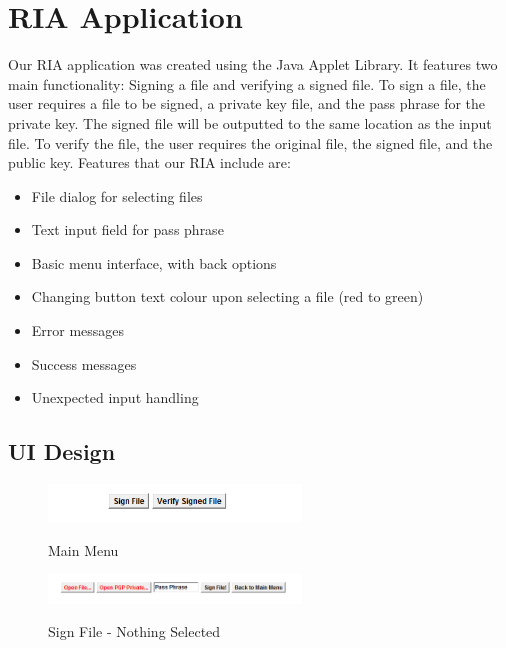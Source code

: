\section{RIA Application}

Our RIA application was created using the Java Applet Library. It features two main functionality: Signing a file and verifying a signed file. To sign a file, the user requires a file to be signed, a private key file, and the pass phrase for the private key. The signed file will be outputted to the same location as the input file. To verify the file, the user requires the original file, the signed file, and the public key. Features that our RIA include are:

\begin{itemize}
    \item File dialog for selecting files
    \item Text input field for pass phrase
    \item Basic menu interface, with back options
    \item Changing button text colour upon selecting a file (red to green)
    \item Error messages
    \item Success messages 
    \item Unexpected input handling
\end{itemize}

\subsection{UI Design}

\begin{figure}[hbt!]
	\centering
      \includegraphics[width=0.6\textwidth]{imgs/ria/main} \\
	\caption{Main Menu}
	\label{fig:specifiyingkeysize}
    \noindent\makebox[\linewidth]{}
\end{figure}

\begin{figure}[hbt!]
	\centering
      \includegraphics[width=0.6\textwidth]{imgs/ria/sign} \\
	\caption{Sign File - Nothing Selected}
	\label{fig:specifiyingkeysize}
    \noindent\makebox[\linewidth]{}
\end{figure}

